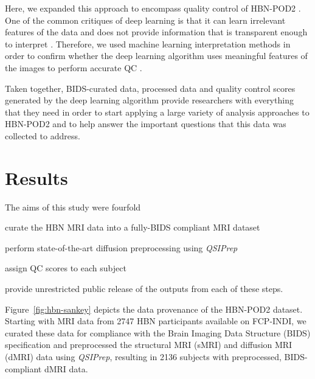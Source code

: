 \documentclass[fleqn,10pt]{wlscirep}
\begin{document}
Here, we expanded this approach to encompass quality control of HBN-POD2
. One of the common critiques of deep learning is that it can learn
irrelevant features of the data and does not provide information that is
transparent enough to interpret . Therefore, we used machine
learning interpretation methods in order to confirm whether the deep learning
algorithm uses meaningful features of the images to perform accurate QC
.

Taken together, BIDS-curated data, processed data and quality control scores
generated by the deep learning algorithm provide researchers with everything
that they need in order to start applying a large variety of analysis approaches
to HBN-POD2 and to help answer the important questions that this data was collected to address.


\section*{Results}

The aims of this study were fourfold
\begin{enumerate*}[%
    label=(\roman*),%
    before=\unskip{: },%
    itemjoin={{, }},%
    itemjoin*={{, and }}]
    \item curate the HBN MRI data into a fully-BIDS compliant MRI dataset
    \item perform state-of-the-art diffusion preprocessing using \emph{QSIPrep}
    \item assign QC scores to each subject
    \item provide unrestricted public release of the outputs from each of these
    steps.
\end{enumerate*}

Figure~\ref{fig:hbn-sankey} depicts the data provenance of the HBN-POD2 dataset.
Starting with MRI data from \num{2747} HBN participants available on FCP-INDI,
we curated these data for compliance with the Brain Imaging Data Structure
(BIDS) specification \cite{gorgolewski2016-lh} and preprocessed the structural
MRI (sMRI) and diffusion MRI (dMRI) data using \emph{QSIPrep}, resulting in
\num{2136} subjects with preprocessed, BIDS-compliant dMRI data.
\end{document}
